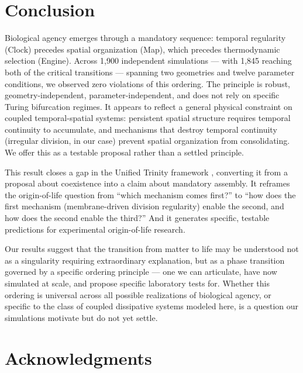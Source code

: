 \documentclass[11pt,letterpaper]{article}
\begin{document}
\section{Conclusion}

Biological agency emerges through a mandatory sequence: temporal regularity (Clock) precedes spatial organization (Map), which precedes thermodynamic selection (Engine). Across 1{,}900 independent simulations --- with 1{,}845 reaching both of the critical transitions --- spanning two geometries and twelve parameter conditions, we observed zero violations of this ordering. The principle is robust, geometry-independent, parameter-independent, and does not rely on specific Turing bifurcation regimes. It appears to reflect a general physical constraint on coupled temporal-spatial systems: persistent spatial structure requires temporal continuity to accumulate, and mechanisms that destroy temporal continuity (irregular division, in our case) prevent spatial organization from consolidating. We offer this as a testable proposal rather than a settled principle.

This result closes a gap in the Unified Trinity framework \citep{farina2025trinity}, converting it from a proposal about coexistence into a claim about mandatory assembly. It reframes the origin-of-life question from ``which mechanism comes first?'' to ``how does the first mechanism (membrane-driven division regularity) enable the second, and how does the second enable the third?'' And it generates specific, testable predictions for experimental origin-of-life research.

Our results suggest that the transition from matter to life may be understood not as a singularity requiring extraordinary explanation, but as a phase transition governed by a specific ordering principle --- one we can articulate, have now simulated at scale, and propose specific laboratory tests for. Whether this ordering is universal across all possible realizations of biological agency, or specific to the class of coupled dissipative systems modeled here, is a question our simulations motivate but do not yet settle.

\section*{Acknowledgments}
\end{document}
